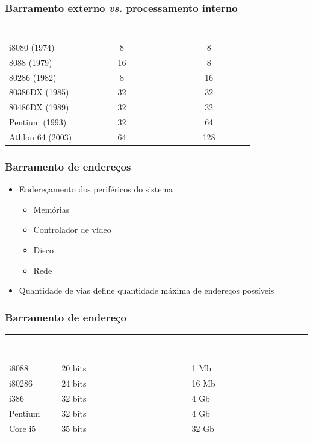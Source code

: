 \documentclass[aspectratio=169,
				xcolor=table]{beamer}
\begin{document}
	\begin{frame}
		\frametitle{Barramento externo \textit{vs.} processamento interno}
		\begin{eftable}
			\begin{tabular}{l | c | c}
				\textcolor{white}{Processador} &
				\textcolor{white}{Processamento interno} &
				\textcolor{white}{Barramento externo} \\
				i8080 (1974) & 8 & 8 \\
				8088 (1979) & 16 & 8 \\
				80286 (1982) & 8 & 16 \\
				80386DX (1985) & 32 & 32 \\
				80486DX (1989) & 32 & 32 \\
				Pentium (1993) & 32 & 64 \\
				Athlon 64 (2003) & 64 & 128 			
			\end{tabular}
		\end{eftable}
	\end{frame}
	
	\begin{frame}
		\frametitle{Barramento de endereços}
		\begin{itemize}
			\item Endereçamento dos periféricos do sistema
			\begin{itemize}
				\item Memórias
				\item Controlador de vídeo
				\item Disco
				\item Rede

			\end{itemize}
			\vspace{1em}
			\item Quantidade de vias define quantidade máxima de endereços possíveis

		\end{itemize}
	\end{frame}
	
	\begin{frame}
		\frametitle{Barramento de endereço}
		\begin{eftable}
			\begin{tabular}{l | m{} | m{0.25\textwidth}}
				\textcolor{white}{Processador} & 
				\textcolor{white}{Largura do barramento  de endereços} & 
				\textcolor{white}{Quantidade máxima de endereços} \\
				i8088       & 20 bits & 1 Mb \\
				i80286      & 24 bits & 16 Mb \\
				i386        & 32 bits & 4 Gb  \\
				Pentium     & 32 bits & 4 Gb \\
				Core i5     & 35 bits & 32 Gb                         
			\end{tabular}
		\end{eftable}
	\end{frame}
	
\end{document}
